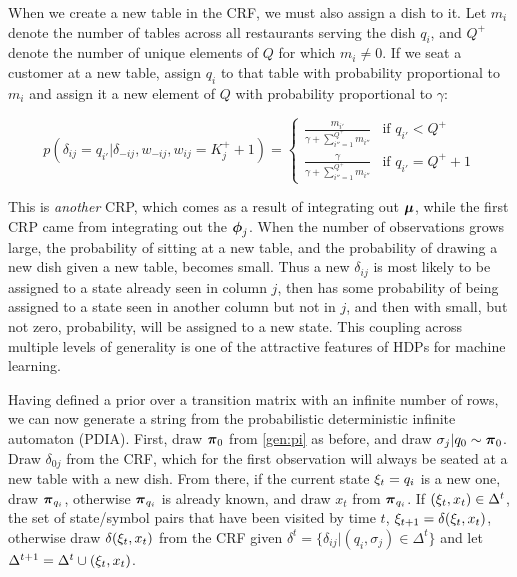 {When we create a new table in the CRF, we must also assign a dish to it.    Let $m_i$ denote the number of tables across all restaurants serving the dish $q_i$, and $Q^+$ denote the number of unique elements of $Q$ for which $m_i \ne 0$.  If we seat a customer at a new table, assign $q_i$ to that table with probability proportional to $m_i$ and assign it a new element of $Q$ with probability proportional to $\gamma$:

\begin{equation}
p(\delta_{ij} = q_{i'} | \delta_{-ij}, w_{-ij}, w_{ij} = K^+_j + 1) = 
\begin{cases}
\frac{m_{i'}}{\gamma + \sum_{i'' = 1}^{Q^+} m_{i''} } & \text{if } q_{i'} < Q^+ \\
\frac{\gamma}{\gamma + \sum_{i'' = 1}^{Q^+} m_{i''} } & \text{if } q_{i'} = Q^+ + 1\label{crf:high}
\end{cases}
\end{equation}

This is {\em another} CRP, which comes as a result of integrating out $\bmu$, while the first CRP came from integrating out the $\bphi_j$.  When the number of observations grows large, the probability of sitting at a new table, and the probability of drawing a new dish given a new table, becomes small.  Thus a new $\delta_{ij}$ is most likely to be assigned to a state already seen in column $j$, then has some probability of being assigned to a state seen in another column but not in $j$, and then with small, but not zero, probability, will be assigned to a new state.  This coupling across multiple levels of generality is one of the attractive features of HDPs for machine learning.


Having defined a prior over a transition matrix with an infinite number of rows, we can now generate a string from the probabilistic deterministic infinite automaton (PDIA).  First, draw $\bpi_0$ from \eqref{gen:pi} as before, and draw $\sigma_j|q_0 \sim \bpi_0$.  Draw $\delta_{0j}$ from the CRF, which for the first observation will always be seated at a new table with a new dish.  From there, if the current state $\q_t = q_i$ is a new one, draw $\bpi_{q_i}$, otherwise $\bpi_{q_i}$ is already known, and draw $x_t$ from $\bpi_{q_i}$.  If $(\q_t,x_t) \in \Delta^t$, the set of state/symbol pairs that have been visited by time $t$, $\q_{t+1} = \delta(\q_t,x_t)$, otherwise draw $\delta(\q_t,x_t)$ from the CRF given $\delta^t = \{\delta_{ij}|(q_i,\sigma_j)\in\Delta^t\}$ and let $\Delta^{t+1} = \Delta^t \cup (\q_t,x_t)$.



}
